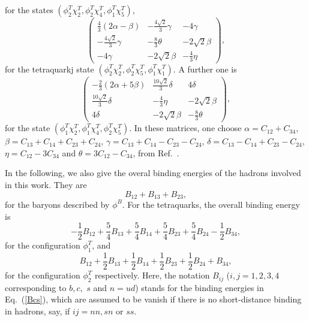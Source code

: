 \documentclass[prd,twocolumn,floatfix,nofootinbib]{revtex4}
\begin{document}
for the states $(\phi _{2}^{T}\chi _{2}^{T},\phi _{2}^{T}\chi _{4}^{T},\phi
_{1}^{T}\chi _{5}^{T})$,
\begin{equation}
\begin{pmatrix}
\frac{4}{3}(2\alpha -\beta ) & -\frac{4\sqrt{2}}{3}\gamma  & -4\gamma  \\
-\frac{4\sqrt{2}}{3}\gamma  & -\frac{8}{3}\theta  & -2\sqrt{2}\beta  \\
-4\gamma  & -2\sqrt{2}\beta  & -\frac{4}{3}\eta
\end{pmatrix}%
,  \label{221mixing254}
\end{equation}%
for the tetraquarkj state $(\phi _{2}^{T}\chi _{2}^{T},\phi _{2}^{T}\chi
_{5}^{T},\phi _{1}^{T}\chi _{1}^{T})$. A further one is
\begin{equation}
\begin{pmatrix}
-\frac{2}{3}(2\alpha +5\beta ) & \frac{10\sqrt{2}}{3}\delta  & 4\delta  \\
\frac{10\sqrt{2}}{3}\delta  & -\frac{4}{3}\eta  & -2\sqrt{2}\beta  \\
4\delta  & -2\sqrt{2}\beta  & -\frac{8}{3}\theta
\end{pmatrix}%
,  \label{112mixing245}
\end{equation}%
for the state $(\phi _{1}^{T}\chi _{2}^{T},\phi _{1}^{T}\chi _{4}^{T},\phi
_{2}^{T}\chi _{5}^{T})$. In these matrices, one choose $\alpha =C_{12}+C_{34}
$, $\beta =C_{13}+C_{14}+C_{23}+C_{24}$, $\gamma =C_{13}+C_{14}-C_{23}-C_{24}
$, $\delta =C_{13}-C_{14}+C_{23}-C_{24}$, $\eta =C_{12}-3C_{34}$ and $\theta
=3C_{12}-C_{34}$, from Ref.~\cite{Luo:2017eub}.

In the following, we also give the overal binding energies of the hadrons
involved in this work. They are
\begin{equation}
B_{12}+B_{13}+B_{23},  \label{phbinding}
\end{equation}%
for the baryons described by $\phi ^{B}$. For the tetraquarks, the overall
binding energy is
\begin{equation}
-\frac{1}{2}B_{12}+\frac{5}{4}B_{13}+\frac{5}{4}B_{14}+\frac{5}{4}B_{23}+%
\frac{5}{4}B_{24}-\frac{1}{2}B_{34},  \label{ph1binding}
\end{equation}%
for the configuration $\phi _{1}^{T}$, and
\begin{equation}
B_{12}+\frac{1}{2}B_{13}+\frac{1}{2}B_{14}+\frac{1}{2}B_{23}+\frac{1}{2}%
B_{24}+B_{34},  \label{ph2binding}
\end{equation}%
for the configuration $\phi _{2}^{T}$ respectively. Here, the notation $%
B_{ij}$ ($i,j=1,2,3,4$ corresponding to $b,c,$ $s$ and $n=ud$) stands for
the binding energies in Eq.~(\ref{Bcs}), which are assumed to be vanish if
there is no short-distance binding in hadrons, say, if $ij=nn,sn$ or $ss$.
\end{document}
